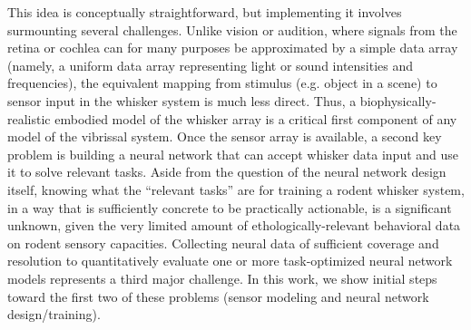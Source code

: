 This idea is conceptually straightforward, but implementing it involves surmounting several challenges.
Unlike vision or audition, where signals from the retina or cochlea can for many purposes be approximated by a simple data array (namely, a uniform data array representing light or sound intensities and frequencies), the equivalent mapping from stimulus (e.g. object in a scene) to sensor input in the whisker system is much less direct.
Thus, a biophysically-realistic embodied model of the whisker array is a critical first component of any model of the vibrissal system.
Once the sensor array is available, a second key problem is building a neural network that can accept whisker data input and use it to solve relevant tasks.
Aside from the question of the neural network design itself, knowing what the ``relevant tasks'' are for training a rodent whisker system, in a way that is sufficiently concrete to be practically actionable, is a significant unknown, given the very limited amount of ethologically-relevant behavioral data on rodent sensory capacities\cite{von2007neuronal, Knutsen2006, OConnor2010, Arabzadeh2005, Diamond2008}.
Collecting neural data of sufficient coverage and resolution to quantitatively evaluate one or more task-optimized neural network models represents a third major challenge.
In this work, we show initial steps toward the first two of these problems (sensor modeling and neural network design/training).



